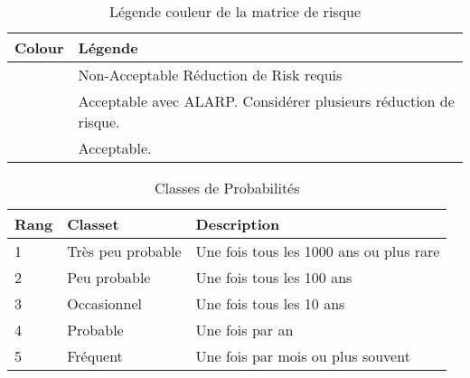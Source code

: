 \documentclass[12pt]{article}
\begin{document}
 

\begin{table}[H]
\centering
\begin{tabular}{|p{2cm}|p{10cm}|}
\hline \bf Colour & \bf Légende \\
\hline \cellcolor{red! 50} & Non-Acceptable Réduction de Risk requis \\ [10pt]
\hline \cellcolor{yellow! 50} & Acceptable avec ALARP. Considérer plusieurs réduction de risque. \\[10pt]
\hline \cellcolor{green! 50} & Acceptable. \\ [10pt]
\hline
\end{tabular}
\caption{Légende couleur de la matrice de risque}
\end{table}

 
\begin{table}[H]
\centering
\begin{tabular}{ p{2cm} p{3cm} p{8cm}}
\hline \bf Rang & \bf Classet & \bf Description \\
\hline 1 & Très peu probable & Une fois tous les 1000 ans ou plus rare \\
2 & Peu probable & Une fois tous les 100 ans \\
3 & Occasionnel & Une fois tous les 10 ans\\
4 & Probable & Une fois par an\\
5 & Fréquent & Une fois par mois ou plus souvent \\

\hline

\end{tabular}
\caption{Classes de Probabilités}

\end{table}
\end{document}
